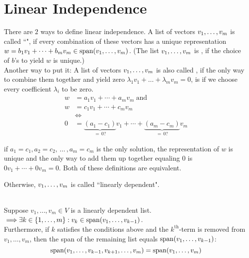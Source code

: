 \section{Linear Independence}
\setcounter{thm}{14}
\begin{mydef}
    There are $2$ ways to define linear independence. A list of vectors $v_1, \dots, v_m$ is called ``\lid", if every combination of these vectors has a unique representation $w = b_1v_1 + \dots+ b_mv_m \in \operatorname{span} (v_1, \dots, v_m)$. (The list $v_1, \dots, v_m$ is \lid, if the choice of $b$'s to yield $w$ is unique.) \\
    Another way to put it: A list of vectors $v_1, \dots, v_m$ is also called \lid, if the only way to combine them together and yield zero $\lambda_1v_1 + \dots + \lambda_mv_m = 0$, is if we choose every coefficient $\lambda_i$ to be zero.
    \begin{equation}
        \begin{aligned}
            w & =a_1 v_1 + \cdots + a_m v_m \; \text{and} \\ 
            w & =c_1 v_1 + \cdots + c_m v_m \\
            & \iff \\
            0 & = \underbrace{(a_1 - c_1)}_{= \, 0\text{?}} v_1 + \cdots + \underbrace{(a_m -c_m)}_{= \, 0\text{?}} v_m
        \end{aligned}
    \end{equation}
    
    if $a_1 = c_1, a_2 = c_2, \, \dots \, , a_m = c_m$ is the only solution, the representation of $w$ is unique and the only way to add them up together equaling $0$ is $0v_1+\cdots+0v_m=0$. Both of these definitions are equivalent.
\end{mydef}


\begin{mydef}
    Otherwise, $v_1, \dots, v_m$ is called ``linearly dependent".
\end{mydef}




\setcounter{thm}{18}
\begin{thm}
    \label{linear-dependence-lemma}
     \\
    Suppose $v_{1}, \dots, v_{m}\in V$ is a linearly dependent list. 
    ${ \color{black}{\implies}} \exists k \in \{ 1, \dots, m \} : v_k \in \operatorname{span} (v_1, \dots, v_{k-1})$. \\
    Furthermore, if $k$ satisfies the conditions above and the $k^{\text{th}}$-term is removed from $v_1, \dots, v_m$, then the span of the remaining list equals $\operatorname{span} (v_1, \dots, v_{k-1})$:
    \begin{equation}
        \operatorname{span} (v_1, \dots, v_{k-1}, v_{k+1}, \dots, v_m) = \operatorname{span} (v_1, \dots, v_m)
    \end{equation}
\end{thm}

